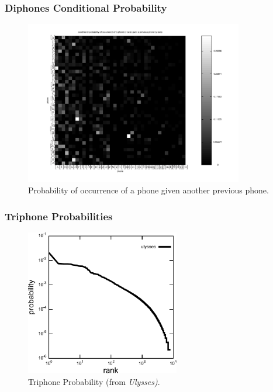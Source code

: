 \documentclass[notes]{beamer}
\begin{document}
\frame
{
  \frametitle{Diphones Conditional Probability}
\vspace{-0.5cm}
\begin{figure}[h!]
\centering
\includegraphics[width=0.85\textwidth]{images/diphones_cond_probability_en.pdf}
\vspace{-0.7cm}
\caption{Probability of occurrence of a phone given another previous phone.}
\label{fig:diphones_cond_probability_en}
\end{figure} 
}





\frame
{
  \frametitle{Triphone Probabilities}
  \begin{figure}[h!]
  \centering
  \includegraphics[width=0.6\textwidth]{imagespresentation/ulysses_triphones_probabilities.pdf}
  \caption{Triphone Probability (from \emph{Ulysses)}.}
  \label{fig:ulysses_triphones_probabilities}
  \end{figure} 
}
\end{document}
